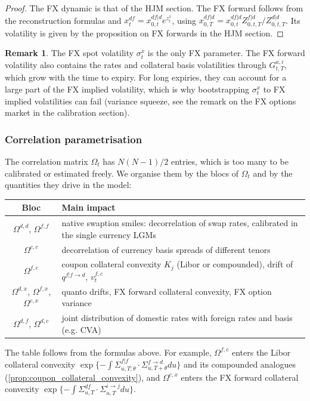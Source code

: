 \documentclass[11pt,english]{amsart}
\theoremstyle{definition}
\newtheorem{rema}{Remark}
\begin{document}
\begin{proof}
The FX dynamic is that of the HJM section. The FX forward follows from the reconstruction formulas and $x^{df}_t = x^{df|d}_{0,t}e^{z^x_t}$, using $x^{df|d}_{0,T} = x^{df|d}_{0,t}Z^{f|d}_{0,t,T}/Z^{d|d}_{0,t,T}$. Its volatility is given by the proposition on FX forwards in the HJM section.
\end{proof}

\begin{rema}
The FX spot volatility $\sigma^x_t$ is the only FX parameter. The FX forward volatility also contains the rates and collateral basis volatilities through $G^{a,i}_{t,T}$, which grow with the time to expiry. For long expiries, they can account for a large part of the FX implied volatility, which is why bootstrapping $\sigma^x_t$ to FX implied volatilities can fail (variance squeeze, see the remark on the FX options market in the calibration section).
\end{rema}



\subsubsection{Correlation parametrisation}%

The correlation matrix $\Omega_t$ has $N(N-1)/2$ entries, which is too many to be calibrated or estimated freely. We organise them by the blocs of $\Omega_t$ and by the quantities they drive in the model:
\begin{center}
\begin{tabular}{|c|l|}
\hline
Bloc & Main impact \\
\hline
$\Omega^{d,d}$, $\Omega^{f,f}$ & native swaption smiles: decorrelation of swap rates, calibrated in the single currency LGMs \\
$\Omega^{c,c}$ & decorrelation of currency basis spreads of different tenors \\
$\Omega^{f,c}$ & coupon collateral convexity $K_j$ (Libor or compounded), drift of $q^{f|f\to d}$, $v^{f,c}_t$ \\
$\Omega^{d,x}$, $\Omega^{f,x}$, $\Omega^{c,x}$ & quanto drifts, FX forward collateral convexity, FX option variance \\
$\Omega^{d,f}$, $\Omega^{d,c}$ & joint distribution of domestic rates with foreign rates and basis (e.g. CVA) \\
\hline
\end{tabular}
\end{center}
The table follows from the formulas above. For example, $\Omega^{f,c}$ enters the Libor collateral convexity $\exp\{-\int \Sigma^{f|f}_{u,T;\theta}\cdot\Sigma^{f\to d}_{u,T+\theta}du\}$ and its compounded analogues (\autoref{prop:coupon_collateral_convexity}), and $\Omega^{c,x}$ enters the FX forward collateral convexity $\exp\{-\int\Sigma^{df}_{u,T}\cdot\Sigma^{i\to j}_{u,T}du\}$.
\end{document}
